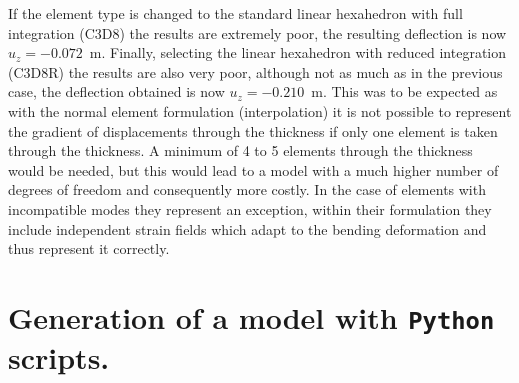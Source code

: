 \documentclass[english,a4paper,12pt]{article}
\begin{document}
If the element type is changed to the standard linear hexahedron with full integration (C3D8) the results are extremely poor, the resulting deflection is now $u_{z}=-0.072$~m.
Finally, selecting the linear hexahedron with reduced integration (C3D8R) the results are also very poor, although not as much as in the previous case, the deflection obtained is now $u_{z}=-0.210$~m.
This was to be expected as with the normal element formulation (interpolation) it is not possible to represent the gradient of displacements through the thickness if only one element is taken through the thickness.
A minimum of 4 to 5 elements through the thickness would be needed, but this would lead to a model with a much higher number of degrees of freedom and consequently more costly.
In the case of elements with incompatible modes they represent an exception, within their formulation they include independent strain fields which adapt to the bending deformation and thus represent it correctly.

\clearpage

\section{Generation of a model with \texttt{Python} scripts.}

\end{document}
